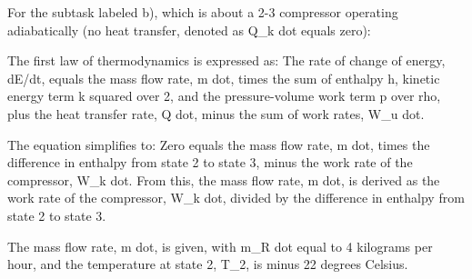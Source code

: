 For the subtask labeled b), which is about a 2-3 compressor operating adiabatically (no heat transfer, denoted as Q_k dot equals zero):

The first law of thermodynamics is expressed as:
The rate of change of energy, dE/dt, equals the mass flow rate, m dot, times the sum of enthalpy h, kinetic energy term k squared over 2, and the pressure-volume work term p over rho, plus the heat transfer rate, Q dot, minus the sum of work rates, W_u dot.

The equation simplifies to:
Zero equals the mass flow rate, m dot, times the difference in enthalpy from state 2 to state 3, minus the work rate of the compressor, W_k dot. From this, the mass flow rate, m dot, is derived as the work rate of the compressor, W_k dot, divided by the difference in enthalpy from state 2 to state 3.

The mass flow rate, m dot, is given, with m_R dot equal to 4 kilograms per hour, and the temperature at state 2, T_2, is minus 22 degrees Celsius.